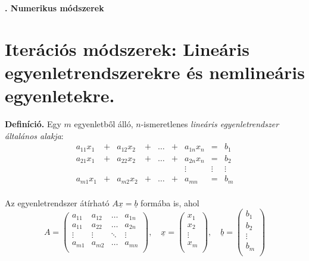 \documentclass[tikz,12pt,margin=0px]{article}
\begin{document}
    \thispagestyle{fancy}
    \begin{center}
        {\Large\bfseries{}. Numerikus módszerek} \\
    \end{center}
	
	\section*{Iterációs módszerek: Lineáris egyenletrendszerekre és nemlineáris egyenletekre.}
	
    \textbf{Definíció.} Egy $m$ egyenletből álló, $n$-ismeretlenes \emph{lineáris egyenletrendszer általános alakja}:
    \[
          \begin{array}{ccccccccc}
            a_{11}x_{1} & + & a_{12}x_{2} & + & \ldots & + & a_{1n}x_{n} & = & b_{1} \\
            a_{21}x_{1} & + & a_{22}x_{2} & + & \ldots & + & a_{2n}x_{n} & = & b_{2} \\
              &   &   &   &   &   & \vdots  & \vdots & \vdots \\
            a_{m1}x_{1} & + & a_{m2}x_{2} & + & \ldots & + & a_{mn} & = & b_{m} \\
          \end{array}
    \]

    \noindent Az egyenletrendszer átírható $A\underline{x} = \underline{b}$ formába is, ahol\\
    \[
        A = \left(
              \begin{array}{cccc}
                a_{11} & a_{12} & \ldots & a_{1n} \\
                a_{11} & a_{22} & \ldots & a_{2n} \\
                \vdots & \vdots & \ddots & \vdots \\
                a_{m1} & a_{m2} & \ldots & a_{mn} \\
              \end{array}
            \right), \quad
        \underline{x} = \left(
              \begin{array}{c}
                x_{1} \\
                x_{2} \\
                \vdots \\
                x_{m} \\
              \end{array}
            \right), \quad
        \underline{b} = \left(
              \begin{array}{c}
                b_{1} \\
                b_{2} \\
                \vdots \\
                b_{m} \\
              \end{array}
            \right)
    \]\\
\end{document}
